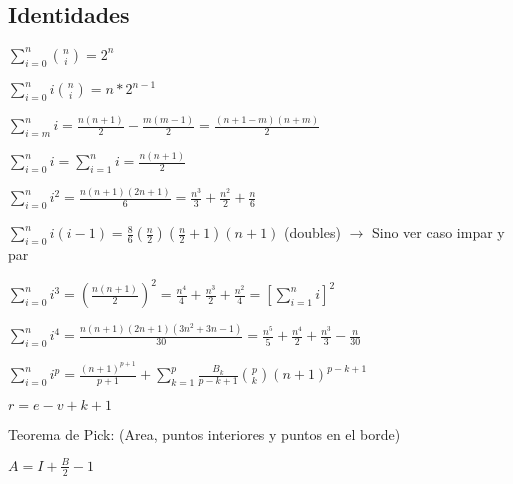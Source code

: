 \subsection{Identidades}
{
$\sum_{i=0}^n\binom{n}{i}=2^n$

$\sum_{i=0}^n i\binom{n}{i}=n*2^{n-1}$

$\sum_{i=m}^n i = \frac{n(n+1)}{2} - \frac{m(m-1)}{2} = \frac{(n+1-m)(n+m)}{2}$

$\sum_{i=0}^n i = \sum_{i=1}^n i = \frac{n(n+1)}{2}$

$\sum_{i=0}^n i^2 = \frac{n(n+1)(2n+1)}{6} = \frac{n^3}{3} + \frac{n^2}{2} + \frac{n}{6}$

$\sum_{i=0}^n i(i-1) = \frac{8}{6}(\frac{n}{2})(\frac{n}{2}+1)(n+1)$ (doubles) $\rightarrow$ Sino ver caso impar y par

$\sum_{i=0}^n i^3 = \left(\frac{n(n+1)}{2}\right)^2 = \frac{n^4}{4} + \frac{n^3}{2} + \frac{n^2}{4} = \left[\sum_{i=1}^n i\right]^2$

$\sum_{i=0}^n i^4 = \frac{n(n+1)(2n+1)(3n^2+3n-1)}{30} = \frac{n^5}{5} + \frac{n^4}{2} + \frac{n^3}{3} - \frac{n}{30}$

$\sum_{i=0}^n i^p = \frac{(n+1)^{p+1}}{p+1} + \sum_{k=1}^p\frac{B_k}{p-k+1}{p\choose k}(n+1)^{p-k+1}$

$r=e-v+k+1$

Teorema de Pick: (Area, puntos interiores y puntos en el borde)

$A=I+\frac{B}{2}-1$






}
